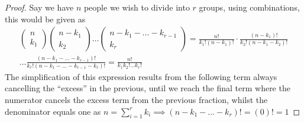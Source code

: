 \begin{proof}
  Say we have $n$ people we wish to divide into $r$ groups, using combinations, this would be given as
  \begin{equation*}
      \begin{gathered}
          \begin{pmatrix}n\\k_{1}\end{pmatrix}\begin{pmatrix}n-k_{1}\\k_{2}\end{pmatrix}\ldots\begin{pmatrix}n-k_{1}-\ldots-k_{r-1}\\k_{r}\end{pmatrix}=\frac{n!}{k_{1}!(n-k_{1})!}\cdot\frac{(n-k_{1})!}{k_{2}!(n-k_{1}-k_{2})!} \\
          \ldots\frac{(n-k_{1}-\ldots-k_{r-1})!}{k_{r}!(n-k_{1}-\ldots-k_{r-1}-k_{r})!}=\frac{n!}{k_{1}k_{2}!\ldots k_{r}!}
      \end{gathered}
  \end{equation*}
  The simplification of this expression results from the following term always cancelling the ``excess'' in the previous, until we reach the final term where the numerator cancels the excess term from the previous fraction, whilst the denominator equals one as $n=\sum_{i=1}^{r}k_{i}\implies (n-k_{1}-\ldots-k_{r})!=(0)!=1$
\end{proof}
